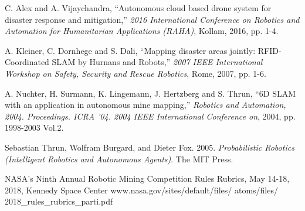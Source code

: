 \documentclass[journal]{IEEEtran}
\begin{document}
%
%
%
\begin{thebibliography}{3}

C. Alex and A. Vijaychandra, ``Autonomous cloud based drone system
for disaster response and mitigation,'' \emph{2016 International Conference 
on Robotics and Automation for Humanitarian Applications (RAHA)}, Kollam, 
2016, pp. 1-4.

A. Kleiner, C. Dornhege and S. Dali, ``Mapping disaster areas jointly: 
RFID-Coordinated SLAM by Hurnans and Robots,'' \emph{2007 IEEE International 
Workshop on Safety, Security and Rescue Robotics}, Rome, 2007, pp. 1-6.

A. Nuchter, H. Surmann, K. Lingemann, J. Hertzberg and S. Thrun, 
``6D SLAM with an application in autonomous mine mapping,'' 
\emph{Robotics and Automation, 2004. Proceedings. ICRA '04. 2004 IEEE 
International Conference on}, 2004, pp. 1998-2003 Vol.2.

Sebastian Thrun, Wolfram Burgard, and Dieter Fox. 2005. \emph{Probabilistic
Robotics (Intelligent Robotics and Autonomous Agents)}. The MIT Press.

NASA's Ninth Annual Robotic Mining Competition Rules Rubrics, May 14-18, 
2018, Kennedy Space Center www.nasa.gov/sites/default/files/ atoms/files/%
2018\_rules\_rubrics\_parti.pdf

\end{thebibliography}

% 
\end{document}
